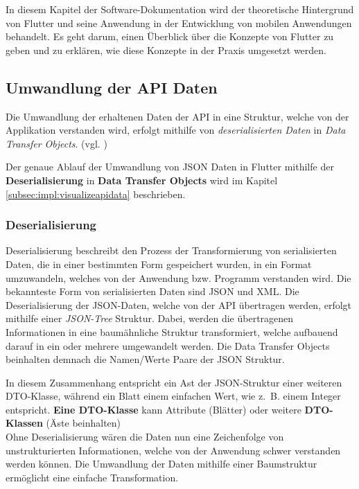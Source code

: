 
In diesem Kapitel der Software-Dokumentation wird der theoretische Hintergrund von Flutter und seine Anwendung in der Entwicklung von mobilen Anwendungen behandelt. Es geht darum, einen Überblick über die Konzepte von Flutter zu geben und zu erklären, wie diese Konzepte in der Praxis umgesetzt werden.

\subsection{Umwandlung der API Daten}
Die Umwandlung der erhaltenen Daten der API in eine Struktur, welche von der Applikation verstanden wird, erfolgt mithilfe von {\textit{deserialisierten Daten}} in {\textit{Data Transfer Objects}}. (vgl. \cite{flutter-serialization-json})

Der genaue Ablauf der Umwandlung von JSON Daten in Flutter mithilfe der {\textbf{Deserialisierung}} in {\textbf{Data Transfer Objects}} wird im Kapitel \ref{subsec:impl:visualizeapidata}  beschrieben.

\subsubsection{Deserialisierung}\label{subsec:thero:deserialization}
Deserialisierung beschreibt den Prozess der Transformierung von serialisierten Daten, die in einer bestimmten Form gespeichert wurden, in ein Format umzuwandeln, welches von der Anwendung bzw. Programm verstanden wird. Die bekannteste Form von serialisierten Daten sind JSON und XML. 
Die Deserialisierung der JSON-Daten, welche von der API übertragen werden, erfolgt mithilfe einer {\textit{JSON-Tree}} Struktur. Dabei, werden die übertragenen Informationen in eine baumähnliche Struktur transformiert, welche aufbauend darauf in ein oder mehrere  umgewandelt werden. Die Data Transfer Objects beinhalten demnach die Namen/Werte Paare der JSON Struktur. 

In diesem Zusammenhang entspricht ein Ast der JSON-Struktur einer weiteren DTO-Klasse, während ein Blatt einem einfachen Wert, wie z. B. einem Integer entspricht. {\textbf{Eine DTO-Klasse}} kann Attribute (Blätter) oder weitere  {\textbf{DTO-Klassen}} (Äste beinhalten)
\\
Ohne Deserialisierung wären die Daten nun eine Zeichenfolge von unstrukturierten Informationen, welche von der Anwendung schwer verstanden werden können. Die Umwandlung der Daten mithilfe einer Baumstruktur ermöglicht eine einfache Transformation.


